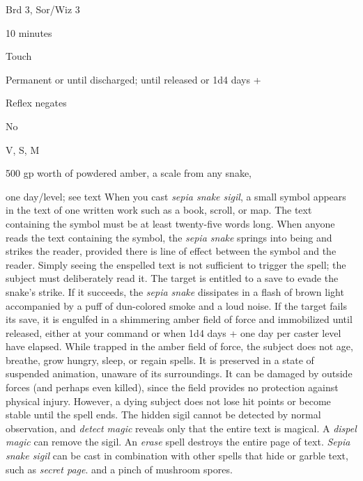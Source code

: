 
\begin{description*}
\item[Level:] Brd 3, Sor/Wiz 3
\item[Casting Time:] 10 minutes
\item[Range:] Touch
\item[Duration:] Permanent or until discharged; until released or 1d4 days +
\item[Saving Throw:] Reflex negates
\item[Spell Resistance:] No
\item[Components:] V, S, M
\item[Arcane Material Component:] 500 gp worth of powdered amber, a scale from any snake,
\end{description*}

one day/level; see text
When you cast \textit{sepia snake sigil}, a small symbol appears in the text of
one written work such as a book, scroll, or map. The text containing the symbol
must be at least twenty-five words long. When anyone reads the text containing
the symbol, the \textit{sepia snake} springs into being and strikes the reader,
provided there is line of effect between the symbol and the reader.
Simply seeing the enspelled text is not sufficient to trigger the spell; the subject
must deliberately read it. The target is entitled to a save to evade the snake's
strike. If it succeeds, the \textit{sepia snake} dissipates in a flash of brown
light accompanied by a puff of dun-colored smoke and a loud noise. If the target
fails its save, it is engulfed in a shimmering amber field of force and immobilized
until released, either at your command or when 1d4 days + one day per caster level
have elapsed.
While trapped in the amber field of force, the subject does not age, breathe, grow
hungry, sleep, or regain spells. It is preserved in a state of suspended animation,
unaware of its surroundings. It can be damaged by outside forces (and perhaps even
killed), since the field provides no protection against physical injury. However,
a dying subject does not lose hit points or become stable until the spell ends.
The hidden sigil cannot be detected by normal observation, and \textit{detect magic
}reveals only that the entire text is magical.
A \textit{dispel magic} can remove the sigil. An \textit{erase} spell destroys
the entire page of text.
\textit{Sepia snake sigil} can be cast in combination with other spells that hide
or garble text, such as \textit{secret page}.
and a pinch of mushroom spores.